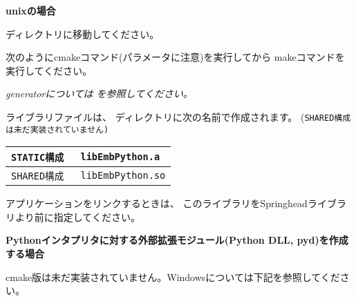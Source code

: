 \medskip
\bf{unixの場合}
\begin{narrow}
	ディレクトリに移動してください。

	次のようにcmakeコマンド(パラメータに注意)を実行してから
	makeコマンドを実行してください。


	\begin{narrow}[s]
		\it{generator}については
		 を参照してください。
	\end{narrow}

	\medskip
	ライブラリファイルは、
	ディレクトリに次の名前で作成されます。
	(\tt{SHARED}構成は未だ実装されていません)

	\medskip
	\begin{center}
	\begin{tabular}{l@{\ \ ---\ \ }l}\hline
		\tt{STATIC}構成 & \tt{libEmbPython.a}\\\hline
		\tt{SHARED}構成 & \tt{libEmbPython.so}\\\hline
	\end{tabular}
	\end{center}

	\bigskip
	アプリケーションをリンクするときは、
	このライブラリをSpringheadライブラリより前に指定してください。
\end{narrow}

\bigskip
\thinrule{\linewidth}
\noindent
\bf{Pythonインタプリタに対する外部拡張モジュール(Python DLL, pyd)を作成する場合}

\bigskip
cmake版は未だ実装されていません。Windowsについては下記を参照してください。

\medskip
{}
\bigskip

